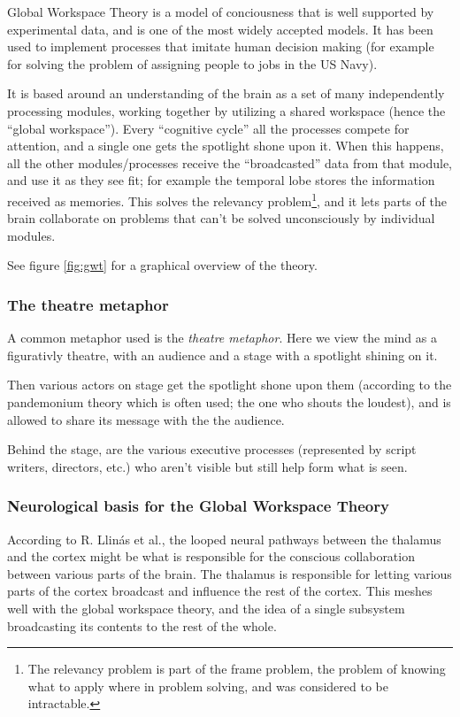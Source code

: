 Global Workspace Theory is a model of conciousness that is well supported by experimental data, and is one of the most widely accepted models. \cite{dehaene2001towards} It has been used to implement processes that imitate human decision making (for example for solving the problem of assigning people to jobs in the US Navy).\cite{baars2005gwt}\cite{franklin2003interacting}

It is based around an understanding of the brain as a set of many independently processing modules, working together by utilizing a shared workspace (hence the ``global workspace''). Every ``cognitive cycle'' all the processes compete for attention, and a single one gets the spotlight shone upon it.\cite{baars2005gwt} When this happens, all the other modules/processes receive the ``broadcasted'' data from that module, and use it as they see fit; for example the temporal lobe stores the information received as memories. This solves the relevancy problem\footnote{The relevancy problem is part of the frame problem, the problem of knowing what to apply where in problem solving, and was considered to be intractable.\cite{shanahan2005applying}}, and it lets parts of the brain collaborate on problems that can't be solved unconsciously by individual modules.

See figure \ref{fig:gwt} for a graphical overview of the theory.

\subsubsection{The theatre metaphor}
A common metaphor used is the {\em theatre metaphor}. Here we view the mind as a figurativly theatre, with an audience and a stage with a spotlight shining on it.

Then various actors on stage get the spotlight shone upon them (according to the pandemonium theory which is often used; the one who shouts the loudest\cite{selfridge1958pandemonium}), and is allowed to share its message with the the audience.

 Behind the stage, are the various executive processes (represented by script writers, directors, etc.) who aren't visible but still help form what is seen.

\subsubsection{Neurological basis for the Global Workspace Theory}
According to R. Llinás et al.\cite{llinas1998neuronal}, the looped neural pathways between the thalamus and the cortex might be what is responsible for the conscious collaboration between various parts of the brain. The thalamus is responsible for letting various parts of the cortex broadcast and influence the rest of the cortex. This meshes well with the global workspace theory, and the idea of a single subsystem broadcasting its contents to the rest of the whole.

